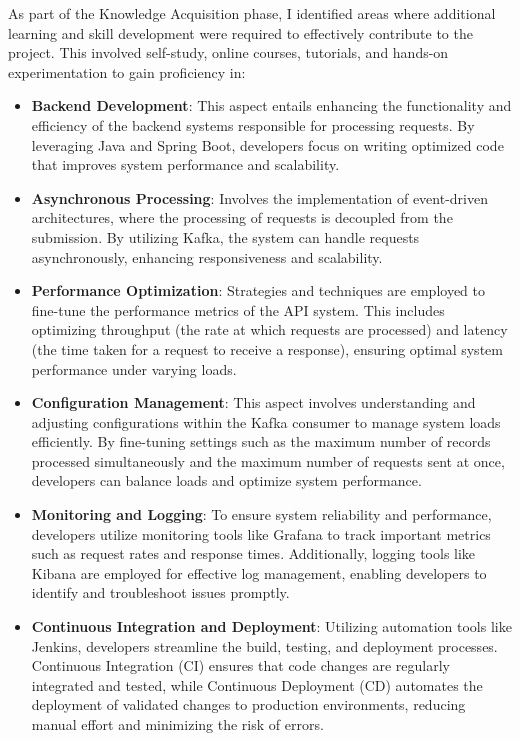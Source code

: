 \documentclass[12pt,a4paper]{report}
\begin{document}
As part of the Knowledge Acquisition phase, I identified areas where additional learning and skill development were required to effectively contribute to the project. This involved self-study, online courses, tutorials, and hands-on experimentation to gain proficiency in:

\begin{itemize}
    \item \textbf{Backend Development}: This aspect entails enhancing the functionality and efficiency of the backend systems responsible for processing requests. By leveraging Java and Spring Boot, developers focus on writing optimized code that improves system performance and scalability.
    
    \item \textbf{Asynchronous Processing}: Involves the implementation of event-driven architectures, where the processing of requests is decoupled from the submission. By utilizing Kafka, the system can handle requests asynchronously, enhancing responsiveness and scalability.
    
    \item \textbf{Performance Optimization}: Strategies and techniques are employed to fine-tune the performance metrics of the API system. This includes optimizing throughput (the rate at which requests are processed) and latency (the time taken for a request to receive a response), ensuring optimal system performance under varying loads.
    
    \item \textbf{Configuration Management}: This aspect involves understanding and adjusting configurations within the Kafka consumer to manage system loads efficiently. By fine-tuning settings such as the maximum number of records processed simultaneously and the maximum number of requests sent at once, developers can balance loads and optimize system performance.
    
    \item \textbf{Monitoring and Logging}: To ensure system reliability and performance, developers utilize monitoring tools like Grafana to track important metrics such as request rates and response times. Additionally, logging tools like Kibana are employed for effective log management, enabling developers to identify and troubleshoot issues promptly.
    
    \item \textbf{Continuous Integration and Deployment}: Utilizing automation tools like Jenkins, developers streamline the build, testing, and deployment processes. Continuous Integration (CI) ensures that code changes are regularly integrated and tested, while Continuous Deployment (CD) automates the deployment of validated changes to production environments, reducing manual effort and minimizing the risk of errors.
\end{itemize}
\end{document}

